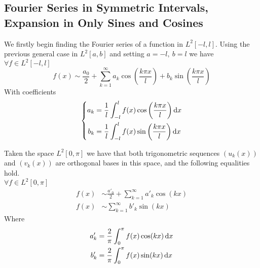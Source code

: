 \documentclass[../complete.tex]{subfiles}
\begin{document}
\subsection{Fourier Series in Symmetric Intervals, Expansion in Only Sines and Cosines}
\begin{dfn}
	We firstly begin finding the Fourier series of a function in $L^2[-l,l]$. Using the previous general case in $L^2[a,b]$ and setting $a=-l,\ b=l$ we have $\forall f\in L^2[-l,l]$
	\begin{equation}
		f(x)\sim\frac{a_0}{2}+\sum_{k=1}^{\infty}a_k\cos\left( \frac{k\pi x}{l} \right)+b_k\sin\left( \frac{k\pi x}{l} \right)
		\label{eq:fouserll}
	\end{equation}
	With coefficients
	\begin{equation}
		\left\{ \begin{aligned}
				a_k&=\frac{1}{l}\int_{-l}^{l}f(x)\cos\left( \frac{k\pi x}{l} \right)\operatorname{d\!} x\\
				b_k&=\frac{1}{l}\int_{-l}^{l}f(x)\sin\left( \frac{k\pi x}{l} \right)\operatorname{d\!} x
		\end{aligned}\right.
		\label{eq:fouserllcoef}
	\end{equation}
\end{dfn}
\begin{thm}
	Taken the space $L^2[0,\pi]$ we have that both trigonometric sequences $(u_k(x))$ and $(v_k(x))$ are orthogonal bases in this space, and the following equalities hold.\\
	$\forall f\in L^2[0,\pi]$
	\begin{equation*}
		\begin{aligned}
			f(x)&\sim\frac{a'_0}{2}+\sum_{k=1}^{\infty}a'_k\cos(kx)\\
			f(x)&\sim\sum_{k=1}^{\infty}b'_k\sin(kx)
		\end{aligned}
	\end{equation*}
	Where
	\begin{equation*}
		\begin{aligned}
			a'_k&=\frac{2}{\pi}\int_{0}^{\pi}f(x)\cos(kx)\operatorname{d\!} x\\
			b'_k&=\frac{2}{\pi}\int_{0}^{\pi}f(x)\sin(kx)\operatorname{d\!} x
		\end{aligned}
	\end{equation*}
\end{thm}
\end{document}
